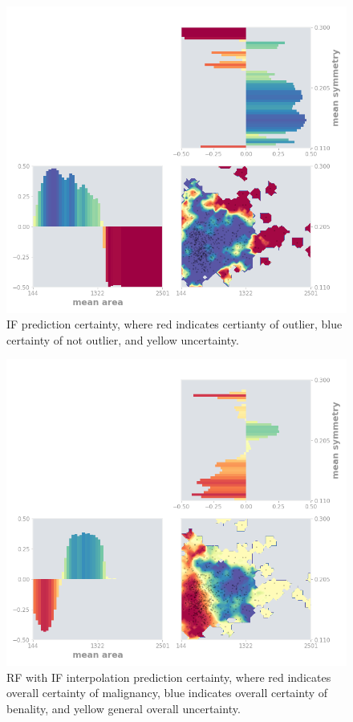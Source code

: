\documentclass[a4paper, oneside, twocolumn]{article}
\begin{document}
\begin{figure}
\centering
\includegraphics[width=0.8\columnwidth]{img/interp_if.png}
\caption{IF prediction certainty, where red indicates certianty of outlier, blue certainty of not outlier, and yellow uncertainty.}
\label{fig:interp-if}
\end{figure}

\begin{figure}
\centering
\includegraphics[width=0.8\columnwidth]{img/interp_rf_if.png}
\caption{RF with IF interpolation prediction certainty, where red indicates overall certainty of malignancy, blue indicates overall certainty of benality, and yellow general overall uncertainty.}
\label{fig:interp-rf-if}
\end{figure}
\end{document}
